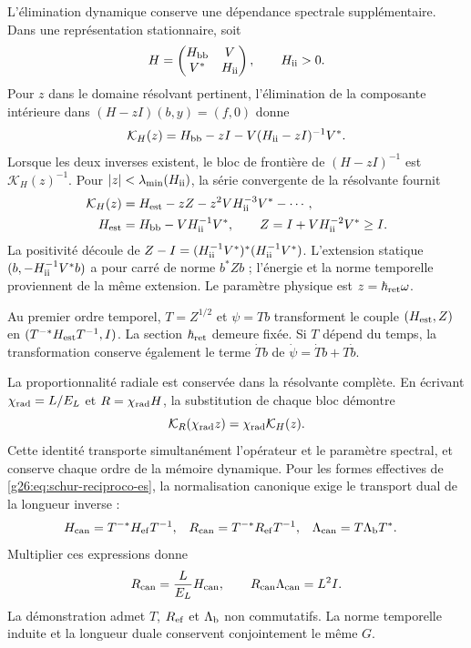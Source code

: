 L'élimination dynamique conserve une dépendance spectrale supplémentaire. Dans une représentation stationnaire, soit
\[
 H=\begin{pmatrix}H_{\rm bb}&V\\V^*&H_{\rm ii}\end{pmatrix},
 \qquad H_{\rm ii}>0.
\]
Pour \(z\) dans le domaine résolvant pertinent, l'élimination de la
composante intérieure dans \((H-zI)(b,y)=(f,0)\) donne
\begin{equation}
 \mathcal K_H(z)=H_{\rm bb}-zI
       -V(H_{\rm ii}-zI)^{-1}V^*.
 \label{g26:eq:resolvente-memoria-es}
\end{equation}
Lorsque les deux inverses existent, le bloc de frontière de
\((H-zI)^{-1}\) est \(\mathcal K_H(z)^{-1}\). Pour
\(|z|<\lambda_{\min}(H_{\rm ii})\), la série convergente de la
résolvante fournit
\begin{align}
 \mathcal K_H(z)&=H_{\rm est}-zZ-z^2VH_{\rm ii}^{-3}V^*-\cdots,
 \label{g26:eq:expansion-resolvente-es}\\
 H_{\rm est}&=H_{\rm bb}-VH_{\rm ii}^{-1}V^*,\qquad
 Z=I+VH_{\rm ii}^{-2}V^*\geq I.
 \label{g26:eq:norma-z-es}
\end{align}
La positivité découle de \(Z-I=(H_{\rm ii}^{-1}V^*)^*(H_{\rm ii}^{-1}V^*)\). L'extension statique \((b,-H_{\rm ii}^{-1}V^*b)\) a pour carré de norme \(b^*Zb\) ; l'énergie et la norme temporelle proviennent de la même extension. Le paramètre physique est \(z=\hbar_{\rm ret}\omega\).

Au premier ordre temporel, \(T=Z^{1/2}\) et \(\psi=Tb\) transforment
le couple \((H_{\rm est},Z)\) en
\((T^{-*}H_{\rm est}T^{-1},I)\). La section
\(\hbar_{\rm ret}\) demeure fixée. Si \(T\) dépend du temps,
la transformation conserve également le terme \(\dot T b\) de
\(\dot\psi=\dot T b+T\dot b\).

La proportionnalité radiale est conservée dans la résolvante complète.
En écrivant \(\chi_{\rm rad}=L/E_{L}\) et \(R=\chi_{\rm rad} H\), la substitution de
chaque bloc démontre
\begin{equation}
 \mathcal K_R(\chi_{\rm rad} z)=\chi_{\rm rad}\mathcal K_H(z).
 \label{g26:eq:resolvente-proporcional-es}
\end{equation}
Cette identité transporte simultanément l'opérateur et le paramètre spectral, et conserve chaque ordre de la mémoire dynamique. Pour les formes effectives de \eqref{g26:eq:schur-reciproco-es}, la normalisation canonique exige le transport dual de la longueur inverse :
\begin{align*}
 H_{\rm can}&=T^{-*}H_{\rm ef}T^{-1},&
 R_{\rm can}&=T^{-*}R_{\rm ef}T^{-1},&
 \Lambda_{\rm can}&=T\Lambda_{\rm b}T^*.
\end{align*}
Multiplier ces expressions donne
\[
 R_{\rm can}=\frac{L}{E_{L}}H_{\rm can},\qquad
 R_{\rm can}\Lambda_{\rm can}=L^2I.
\]
La démonstration admet \(T\), \(R_{\rm ef}\) et
\(\Lambda_{\rm b}\) non commutatifs. La norme temporelle induite et
la longueur duale conservent conjointement le même \(G\).

